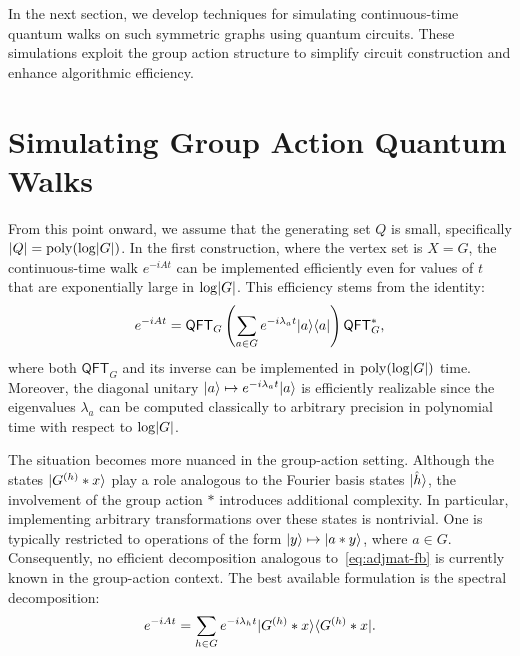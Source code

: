 \documentclass[12pt]{report}
\newcommand{\qft}{\mathsf{QFT}}
\begin{document}

In the next section, we develop techniques for simulating continuous-time quantum walks on such symmetric graphs using quantum circuits. These simulations exploit the group action structure to simplify circuit construction and enhance algorithmic efficiency.




\chapter{Simulating Group Action Quantum Walks}\label{chap:simulating}


From this point onward, we assume that the generating set \( Q \) is small, specifically \( \lvert Q\rvert = \operatorname{poly}(\log \lvert G\rvert) \). In the first construction, where the vertex set is \( X = G \), the continuous-time walk \( e^{-iAt} \) can be implemented efficiently even for values of \( t \) that are exponentially large in \( \log \lvert G\rvert \). This efficiency stems from the identity:
\begin{equation}
    \label{eq:adjmat-fb}
    e^{-iAt} = \qft_G \left( \sum_{a \in G} e^{-i\lambda_a t} \ket{a} \bra{a} \right) \qft_G^*,
\end{equation}
where both \( \qft_G \) and its inverse can be implemented in \( \operatorname{poly}(\log \lvert G\rvert) \) time. Moreover, the diagonal unitary \( \lvert a\rangle \mapsto e^{-i\lambda_a t} \lvert a\rangle \) is efficiently realizable since the eigenvalues \( \lambda_a \) can be computed classically to arbitrary precision in polynomial time with respect to \( \log \lvert G\rvert \).

The situation becomes more nuanced in the group-action setting. Although the states \( \lvert G^{(h)} * x\rangle \) play a role analogous to the Fourier basis states \( \lvert\hat{h}\rangle \), the involvement of the group action \( * \) introduces additional complexity. In particular, implementing arbitrary transformations over these states is nontrivial. One is typically restricted to operations of the form \( \lvert y\rangle \mapsto \lvert a * y\rangle \), where \( a \in G \). Consequently, no efficient decomposition analogous to~\eqref{eq:adjmat-fb} is currently known in the group-action context. The best available formulation is the spectral decomposition:
\[
e^{-iAt} = \sum_{h \in G} e^{-i\lambda_h t} \lvert G^{(h)} * x\rangle \langle G^{(h)} * x\rvert.
\]
\end{document}
